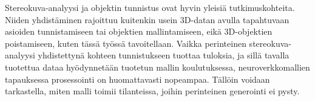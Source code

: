 Stereokuva-analyysi ja objektin tunnistus ovat hyvin yleisiä tutkimuskohteita.
Niiden yhdistäminen rajoittuu kuitenkin usein 3D-datan avulla tapahtuvaan asioiden tunnistamiseen tai objektien mallintamiseen, eikä 3D-objektien poistamiseen, kuten tässä työssä tavoitellaan.
Vaikka perinteinen stereokuva-analyysi yhdistettynä kohteen tunnistukseen tuottaa tuloksia, ja sillä tavalla tuotettua dataa hyödynnetään tuotetun mallin koulutuksessa, neuroverkkomallien tapauksessa prosessointi on huomattavasti nopeampaa.
Tällöin voidaan tarkastella, miten malli toimii tilanteissa, joihin perinteinen generointi ei pysty.
